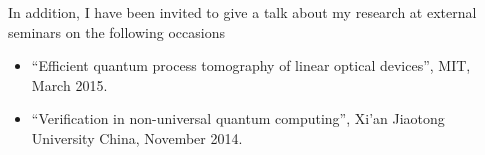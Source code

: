 In addition, I have been invited to give a talk about my research at external
seminars on the following occasions
\begin{itemize}
  \item ``Efficient quantum process tomography of linear optical devices'',
    MIT, March 2015.
  \item ``Verification in non-universal quantum computing'', Xi'an Jiaotong
    University China, November 2014.
\end{itemize}
